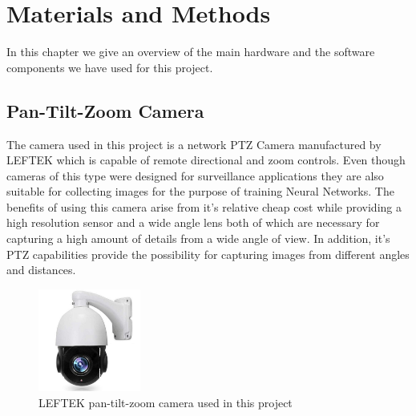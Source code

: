 \documentclass{l4proj}
\begin{document}
\chapter{Materials and Methods}

In this chapter we give an overview of the main hardware and the software components we have used for this project.




\section{Pan-Tilt-Zoom Camera} 

The camera used in this project is a network PTZ Camera manufactured by LEFTEK which is capable of remote directional and zoom controls. Even though cameras of this type were designed for surveillance applications they are also suitable for collecting images for the purpose of training Neural Networks. The benefits of using this camera arise from it's relative cheap cost while providing a high resolution sensor and a wide angle lens both of which are necessary for capturing a high amount of details from a wide angle of view. In addition, it's PTZ capabilities provide the possibility for capturing images from different angles and distances. 





\begin{figure}[ht]
    \centering
    \includegraphics[width=0.3\textwidth]{l4template-master/images/ptzCamera.jpg}
    \caption{LEFTEK pan-tilt-zoom camera used in this project}
    \label{ptzCamera}
\end{figure}
\end{document}

